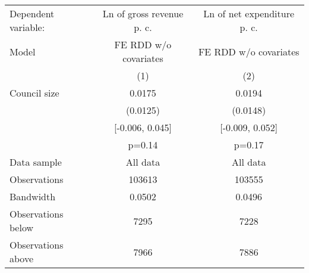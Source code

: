 \begin{tabular}{lcc}
  \toprule
 \midrule
Dependent variable: & Ln of gross revenue p. c. & Ln of net expenditure p. c. \\ 
 Model & FE RDD w/o covariates & FE RDD w/o covariates \\ 
   & (1) & (2) \\ 
   \midrule
Council size & 0.0175 & 0.0194 \\ 
   & (0.0125) & (0.0148) \\ 
   & [-0.006, 0.045] & [-0.009, 0.052] \\ 
   & p=0.14 & p=0.17 \\ 
   \midrule
Data sample & All data & All data \\ 
  Observations & 103613 & 103555 \\ 
  Bandwidth & 0.0502 & 0.0496 \\ 
  Observations below & 7295 & 7228 \\ 
  Observations above & 7966 & 7886 \\ 
   \midrule
 \bottomrule
\end{tabular}
